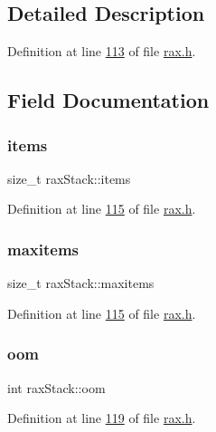 \subsection{Detailed Description}


Definition at line \hyperlink{rax_8h_source_l00113}{113} of file \hyperlink{rax_8h_source}{rax.\+h}.



\subsection{Field Documentation}
\mbox{\label{structraxStack_ae4cc1cd302cff15fd405314b0bd1bee9}} 
\subsubsection{\texorpdfstring{items}{items}}
{\footnotesize\ttfamily size\+\_\+t rax\+Stack\+::items}



Definition at line \hyperlink{rax_8h_source_l00115}{115} of file \hyperlink{rax_8h_source}{rax.\+h}.

\mbox{\label{structraxStack_a2e8d5064ac6ec6b2372e269191bdc1da}} 
\subsubsection{\texorpdfstring{maxitems}{maxitems}}
{\footnotesize\ttfamily size\+\_\+t rax\+Stack\+::maxitems}



Definition at line \hyperlink{rax_8h_source_l00115}{115} of file \hyperlink{rax_8h_source}{rax.\+h}.

\mbox{\label{structraxStack_a069a0214f5210f38da70eed3422ad05f}} 
\subsubsection{\texorpdfstring{oom}{oom}}
{\footnotesize\ttfamily int rax\+Stack\+::oom}



Definition at line \hyperlink{rax_8h_source_l00119}{119} of file \hyperlink{rax_8h_source}{rax.\+h}.

